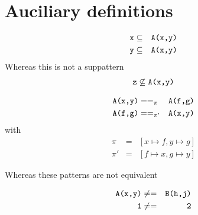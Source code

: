 
\newcommand{\patexp}[2]{#1 \texttt{.} #2}
\newcommand{\fargs}[2]{#1 \texttt{ | } #2}
\newcommand{\cargs}[2]{#1 \texttt{,} #2}
\newcommand{\con}[2]{#1 \texttt{(} #2 \texttt{)}}
\newcommand{\fcall}[2]{#1 \texttt{(} #2 \texttt{)}}
\newcommand{\pipe}{\phantom{\ttt{fu}}\ttt{|}}








\section{Auciliary definitions}

\begin{example}
  \label{ex:suppattern1}
  \begin{eqnarray*}
    \texttt{x} &\subseteq& \texttt{A(x,y)} \\
    \texttt{y} &\subseteq& \texttt{A(x,y)}
\end{eqnarray*}
Whereas this is not a suppattern
\begin{eqnarray*}
  \texttt{z} \not \subseteq \texttt{A(x,y)}
\end{eqnarray*}
\end{example}


\begin{example}[Pattern equivalence, $==_{\pi}$]
  \label{ex:pattern-equiv1}
  \begin{eqnarray*}
    \texttt{A(x,y)} &==_{\pi}& \texttt{A(f,g)}\\
    \texttt{A(f,g)} &==_{\pi'}& \texttt{A(x,y)}
  \end{eqnarray*}
with 
  \begin{eqnarray*}
    \pi &=& [x\mapsto f, y \mapsto g] \\
    \pi' &=& [f \mapsto x, g \mapsto y]
\end{eqnarray*}

Whereas these patterns are not equivalent

  \begin{eqnarray*}
    \texttt{A(x,y)} &\not ==& \texttt{B(h,j)} \\
    \texttt{1} &\not ==& \texttt{2}
  \end{eqnarray*}
\end{example}


